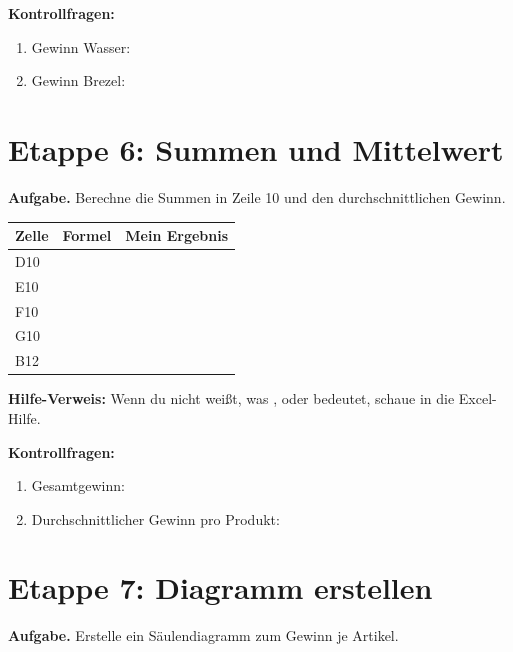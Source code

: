 \textbf{Kontrollfragen:}
\begin{enumerate}[label=\alph*)]
\item Gewinn Wasser: \antwortfeld[2.5cm]
\item Gewinn Brezel: \antwortfeld[2.5cm]
\end{enumerate}

\medskip
\section*{Etappe 6: Summen und Mittelwert}
\begin{boxHinweis}
\textbf{Aufgabe.} Berechne die Summen in Zeile 10 und den durchschnittlichen Gewinn.
\end{boxHinweis}

\begin{tabularx}{\textwidth}{|L{3.5cm}|L{4.2cm}|Y|}
\hline
{}\textbf{Zelle} & \textbf{Formel} & \textbf{Mein Ergebnis}\\\hline
D10 &  & \\\hline
E10 &  & \\\hline
F10 &  & \\\hline
G10 &  & \\\hline
B12 &  & \\\hline
\end{tabularx}

\begin{boxTipp}
\textbf{Hilfe-Verweis:} Wenn du nicht weißt, was ,  oder  bedeutet, schaue in die Excel-Hilfe.
\end{boxTipp}

\textbf{Kontrollfragen:}
\begin{enumerate}[label=\alph*)]
\item Gesamtgewinn: \antwortfeld[2.5cm]
\item Durchschnittlicher Gewinn pro Produkt: \antwortfeld[2.5cm]
\end{enumerate}

\section*{Etappe 7: Diagramm erstellen}
\begin{boxHinweis}
\textbf{Aufgabe.} Erstelle ein Säulendiagramm zum Gewinn je Artikel.
\end{boxHinweis}

